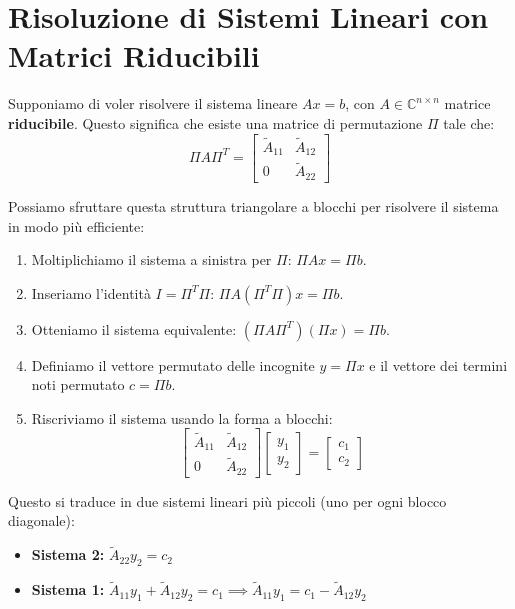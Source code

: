 \documentclass[a4paper,12pt]{article}
\begin{document}
	\section{Risoluzione di Sistemi Lineari con Matrici Riducibili}
	
	Supponiamo di voler risolvere il sistema lineare $Ax = b$, con $A \in \mathbb{C}^{n \times n}$ matrice \textbf{riducibile}.
	Questo significa che esiste una matrice di permutazione $\Pi$ tale che:
	\begin{equation}
		\Pi A \Pi^T = \begin{bmatrix} \tilde{A}_{11} & \tilde{A}_{12} \\ 0 & \tilde{A}_{22} \end{bmatrix}
	\end{equation}
	
	Possiamo sfruttare questa struttura triangolare a blocchi per risolvere il sistema in modo più efficiente:
	\begin{enumerate}
		\item Moltiplichiamo il sistema a sinistra per $\Pi$: $\Pi A x = \Pi b$.
		\item Inseriamo l'identità $I = \Pi^T \Pi$: $\Pi A (\Pi^T \Pi) x = \Pi b$.
		\item Otteniamo il sistema equivalente: $(\Pi A \Pi^T) (\Pi x) = \Pi b$.
		\item Definiamo il vettore permutato delle incognite $y = \Pi x$ e il vettore dei termini noti permutato $c = \Pi b$.
		\item Riscriviamo il sistema usando la forma a blocchi:
		\begin{equation}
			\begin{bmatrix} \tilde{A}_{11} & \tilde{A}_{12} \\ 0 & \tilde{A}_{22} \end{bmatrix} \begin{bmatrix} y_1 \\ y_2 \end{bmatrix} = \begin{bmatrix} c_1 \\ c_2 \end{bmatrix}
		\end{equation}
	\end{enumerate}
	
	Questo si traduce in due sistemi lineari più piccoli (uno per ogni blocco diagonale):
	\begin{itemize}
		\item \textbf{Sistema 2:} $\tilde{A}_{22} y_2 = c_2$
		\item \textbf{Sistema 1:} $\tilde{A}_{11} y_1 + \tilde{A}_{12} y_2 = c_1 \implies \tilde{A}_{11} y_1 = c_1 - \tilde{A}_{12} y_2$
	\end{itemize}
	
\end{document}
